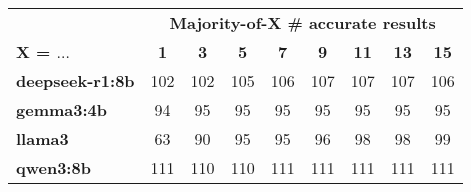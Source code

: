 \begin{tabular}{|l|cccccccc|}\hline
	 & \multicolumn{8}{|c|}{\textbf{Majority-of-X \# accurate results}}\\
	\textbf{X = $\ldots$} & \textbf{1} & \textbf{3} & \textbf{5} & \textbf{7} & \textbf{9} & \textbf{11} & \textbf{13} & \textbf{15} \\\hline
	\textbf{deepseek-r1:8b} & 102 & 102 & 105 & 106 & 107 & 107 & 107 & 106 \\\hline
	\textbf{gemma3:4b} & 94 & 95 & 95 & 95 & 95 & 95 & 95 & 95 \\\hline
	\textbf{llama3} & 63 & 90 & 95 & 95 & 96 & 98 & 98 & 99 \\\hline
	\textbf{qwen3:8b} & 111 & 110 & 110 & 111 & 111 & 111 & 111 & 111 \\\hline
\end{tabular}
